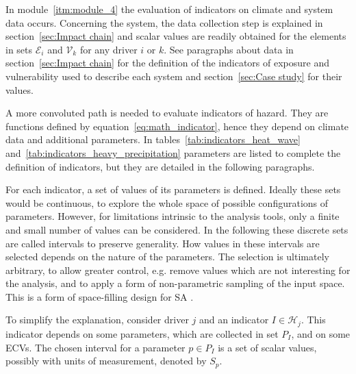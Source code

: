 In module~\ref{itm:module_4} the evaluation of \glspl{indicator} on climate and system data occurs. Concerning the system, the data collection step is explained in section~\ref{sec:Impact chain} and scalar values are readily obtained for the elements in sets $\mathcal{E}_i$ and $\mathcal{V}_k$ for any \gls{driver} $i$ or $k$. See paragraphs about data in section~\ref{sec:Impact chain} for the definition of the \glspl{indicator} of \gls{exposure} and \gls{vulnerability} used to describe each system and section~\ref{sec:Case study} for their values.

A more convoluted path is needed to evaluate \glspl{indicator} of \gls{hazard}. They are functions defined by equation~\eqref{eq:math_indicator}, hence they depend on climate data and additional parameters. In tables~\ref{tab:indicators_heat_wave} and~\ref{tab:indicators_heavy_precipitation} parameters are listed to complete the definition of indicators, but they are detailed in the following paragraphs.

For each \gls{indicator}, a set of values of its parameters is defined. Ideally these sets would be continuous, to explore the whole space of possible configurations of parameters. However, for limitations intrinsic to the analysis tools, only a finite and small number of values can be considered. In the following these discrete sets are called intervals to preserve generality.
How values in these intervals are selected depends on the nature of the parameters. The selection is ultimately arbitrary, to allow greater control, e.g. remove values which are not interesting for the analysis, and to apply a form of non-parametric sampling of the input space. This is a form of space-filling design for \gls{SA} \cite[593-594]{2015DeanHandbookOf}.

To simplify the explanation, consider \gls{driver} $j$ and an \gls{indicator} $I \in \mathcal{H}_j$. This \gls{indicator} depends on some parameters, which are collected in set $P_I$, and on some \glspl{ECV}. The chosen interval for a parameter $p \in P_I$ is a set of scalar values, possibly with units of measurement, denoted by $S_p$.

